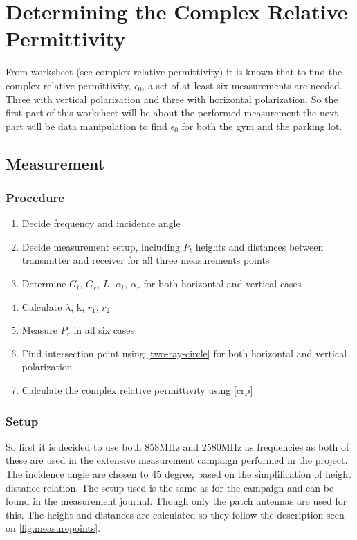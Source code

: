 \chapter{Determining the Complex Relative Permittivity}


From worksheet (see complex relative permittivity) it is known that to find the complex relative permittivity, $\epsilon_0$, a set of at least six measurements are needed. Three with vertical polarization and three with horizontal polarization. So the first part of this worksheet will be about the performed measurement the next part will be data manipulation to find $\epsilon_0$ for both the gym and the parking lot.

\section{Measurement}
\subsection{Procedure}
\begin{enumerate}
	\item Decide frequency and incidence angle
	\item Decide measurement setup, including $P_t$ heights and distances between transmitter and receiver for all three measurements points
	\item Determine $G_t$, $G_r$, $L$, $\alpha_t$, $\alpha_r$ for both horizontal and vertical cases
	\item Calculate $\lambda$, k, $r_1$, $r_2$
	\item Measure $P_r$ in all six cases
	\item Find intersection point using \autoref{two-ray-circle} for both horizontal and vertical polarization
	\item Calculate the complex relative permittivity using \autoref{crp}
\end{enumerate}

\subsection{Setup}
So first it is decided to use both 858MHz and 2580MHz as frequencies as both of these are used in the extensive measurement campaign performed in the project. The incidence angle are chosen to 45 degree, based on the simplification of height distance relation. 
The setup used is the same as for the campaign and can be found in the measurement journal. Though only the patch antennas are used for this. The height and distances are calculated so they follow the description seen on \autoref{fig:measurepoints}. 

